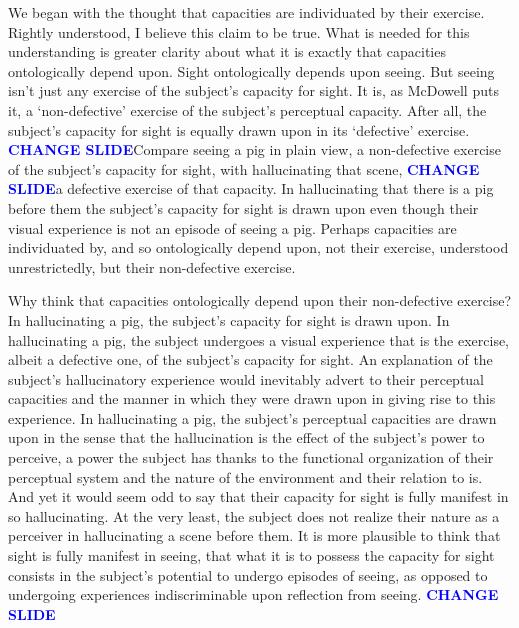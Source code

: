\documentclass[12pt]{article}
\newcommand{\change}{\textcolor{blue}{\textbf{CHANGE SLIDE}}}
\begin{document}
We began with the thought that capacities are individuated by their exercise. Rightly understood, I believe this claim to be true. What is needed for this understanding is greater clarity about what it is exactly that capacities ontologically depend upon. Sight ontologically depends upon seeing. But seeing isn't just any exercise of the subject's capacity for sight. It is, as McDowell puts it, a `non-defective' exercise of the subject's perceptual capacity. After all, the subject's capacity for sight is equally drawn upon in its `defective' exercise. \change Compare seeing a pig in plain view, a non-defective exercise of the subject's capacity for sight, with hallucinating that scene, \change a defective exercise of that capacity. In hallucinating that there is a pig before them the subject's capacity for sight is drawn upon even though their visual experience is not an episode of seeing a pig. Perhaps capacities are individuated by, and so ontologically depend upon, not their exercise, understood unrestrictedly, but their non-defective exercise.

Why think that capacities ontologically depend upon their non-defective exercise? In hallucinating a pig, the subject's capacity for sight is drawn upon. In hallucinating a pig, the subject undergoes a visual experience that is the exercise, albeit a defective one, of the subject's capacity for sight. An explanation of the subject's hallucinatory experience would inevitably advert to their perceptual capacities and the manner in which they were drawn upon in giving rise to this experience. In hallucinating a pig, the subject's perceptual capacities are drawn upon in the sense that the hallucination is the effect of the subject's power to perceive, a power the subject has thanks to the functional organization of their perceptual system and the nature of the environment and their relation to is. And yet it would seem odd to say that their capacity for sight is fully manifest in so hallucinating. At the very least, the subject does not realize their nature as a perceiver in hallucinating a scene before them. It is more plausible to think that sight is fully manifest in seeing, that what it is to possess the capacity for sight consists in the subject's potential to undergo episodes of seeing, as opposed to undergoing experiences indiscriminable upon reflection from seeing. \change
\end{document}

